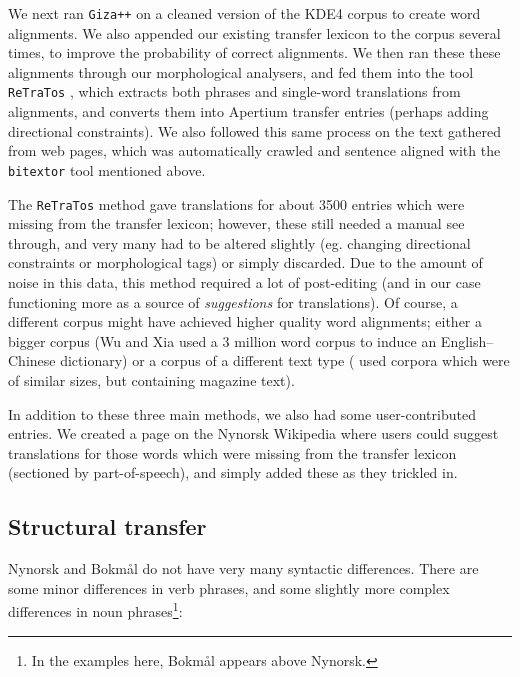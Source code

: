 \documentclass[11pt]{article}
\begin{document}
We next ran {\tt Giza++} \citep{och2003scv} on a cleaned version of the KDE4
corpus to create word alignments. We also appended our existing
transfer lexicon to the corpus several times, to improve the
probability of correct alignments. We then ran these these alignments
through our morphological analysers, and fed them into the tool
{\tt ReTraTos} \citep{caseli2006aib}, which extracts both phrases and
single-word translations from alignments, and converts them into
Apertium transfer entries (perhaps adding directional constraints). We
also followed this same process on the text gathered from web pages,
which was automatically crawled and sentence aligned with the {\tt bitextor}
tool mentioned above.

The {\tt ReTraTos} method gave translations for about 3500 entries which
were missing from the transfer lexicon; however, these still needed a
manual see through, and very many had to be altered slightly (eg.
changing directional constraints or morphological tags) or simply
discarded. Due to the amount of noise in this data, this method
required a lot of post-editing (and in our case functioning more as a
source of \emph{suggestions} for translations). Of course, a different
corpus might have achieved higher quality word alignments; either a
bigger corpus (Wu and Xia \citep[1994, in][p.~230]{caseli2006aib} used
a 3 million word corpus to induce an English–Chinese dictionary) or a
corpus of a different text type (\citet{caseli2006aib} used corpora
which were of similar sizes, but containing magazine text).

In addition to these three main methods, we also had some
user-contributed entries. We created a page on the Nynorsk Wikipedia
where users could suggest translations for those words which were
missing from the transfer lexicon (sectioned by part-of-speech), and
simply added these as they trickled in.


\subsection{Structural transfer}
\label{sec:structural-transfer}
Nynorsk and Bokmål do not have very many syntactic differences. There
are some minor differences in verb phrases, and some slightly more
complex differences in noun phrases\footnote{In the examples here,
  Bokmål appears above Nynorsk.}:
\end{document}
